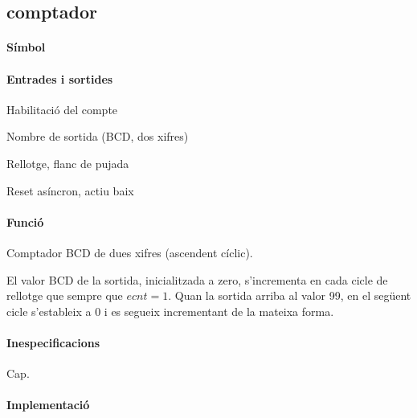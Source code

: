 \subsection{\label{sub:\projectname-comptador} \textsf{comptador}}

\paragraph{Símbol}

\begin{center}  \end{center}

\paragraph{Entrades i sortides}

\begin{where}
\item[\nodenamebit{ecnt}] Habilitació del compte
\item[\nodenamerange{numx}{7}{0}] Nombre de sortida (BCD, dos xifres)
\item[\nodenamebit{clk}] Rellotge, flanc de pujada
\item[\nodenamebit{nrst}] Reset asíncron, actiu baix
\end{where}

\paragraph{Funció}

Comptador BCD de dues xifres (ascendent cíclic).

El valor BCD de la sortida, inicialitzada a zero, s'incrementa en cada cicle de rellotge que sempre que $ecnt = 1$.
Quan la sortida arriba al valor 99, en el següent cicle s'estableix a 0 i es segueix incrementant de la mateixa forma.

\paragraph{Inespecificacions}

Cap.

\paragraph{Implementació}




